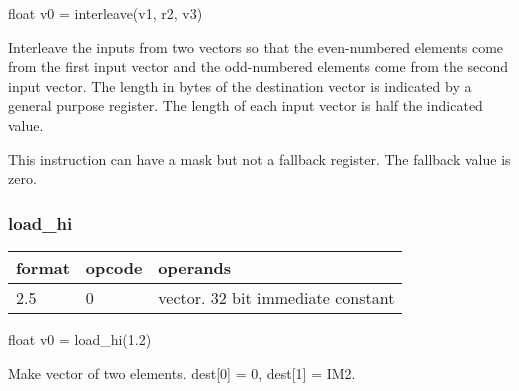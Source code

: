 \documentclass[forwardcom.tex]{subfiles}
\begin{document}
float v0 = interleave(v1, r2, v3)
\vspace{2mm}

Interleave the inputs from two vectors so that the even-numbered elements come from the first input vector and the odd-numbered elements come from the second input vector. The length in bytes of the destination vector is indicated by a general purpose register. The length of each input vector is half the indicated value.
\vspace{2mm}

This instruction can have a mask but not a fallback register. The fallback value is zero.

\subsubsection{load\_hi}
\label{table:loadHiInstruction}
\begin{tabular}{|p{12mm}|p{12mm}|p{110mm}|}
\hline
\bfseries format & \bfseries opcode & \bfseries operands \\ \hline
2.5 & 0 & vector. 32 bit immediate constant \\ \hline
\end{tabular}
\vspace{2mm}

float v0 = load\_hi(1.2)
\vspace{2mm}

Make vector of two elements. dest[0] = 0, dest[1] = IM2.
\vspace{2mm}
\end{document}
